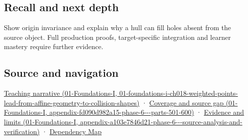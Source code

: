 \subsection{Recall and next depth}\label{appendix-0026ec42c9d5-recall-and-next-depth}

Show origin invariance and explain why a hull can fill holes absent from the source object. Full production proofs, target-specific integration and learner mastery require further evidence.

\subsection{Source and navigation}\label{appendix-0026ec42c9d5-source-and-navigation}

\href{../01-Foundations-I/main.pdf\#nameddest=01-foundations-i-ch018-weighted-points-lead-from-affine-geometry-to-collision-shapes}{Teaching narrative (01-Foundations-I, 01-foundations-i-ch018-weighted-points-lead-from-affine-geometry-to-collision-shapes)} · \href{../01-Foundations-I/main.pdf\#nameddest=appendix-fd090d982a15-phase-6---parts-501-600}{Coverage and source gap (01-Foundations-I, appendix-fd090d982a15-phase-6-\/-\/-parts-501-600)} · \href{../01-Foundations-I/main.pdf\#nameddest=appendix-a103e7846d21-phase-6---source-analysis-and-verification}{Evidence and limits (01-Foundations-I, appendix-a103e7846d21-phase-6-\/-\/-source-analysis-and-verification)} · \hyperref[appendix-4ad47bdd269a]{Dependency Map}
